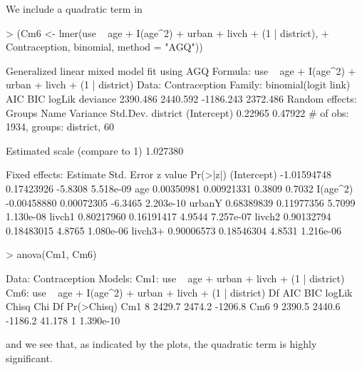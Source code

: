 \documentclass[12pt]{article}
\begin{document}
We include a quadratic term in 
\begin{Schunk}
\begin{Sinput}
> (Cm6 <- lmer(use ~ age + I(age^2) + urban + livch + (1 | district), 
+     Contraception, binomial, method = "AGQ"))
\end{Sinput}
\begin{Soutput}
Generalized linear mixed model fit using AGQ 
Formula: use ~ age + I(age^2) + urban + livch + (1 | district) 
   Data: Contraception 
 Family: binomial(logit link)
      AIC      BIC    logLik deviance
 2390.486 2440.592 -1186.243 2372.486
Random effects:
     Groups        Name    Variance    Std.Dev. 
   district (Intercept)     0.22965     0.47922 
# of obs: 1934, groups: district, 60

Estimated scale (compare to 1)  1.027380 

Fixed effects:
               Estimate  Std. Error z value  Pr(>|z|)
(Intercept) -1.01594748  0.17423926 -5.8308 5.518e-09
age          0.00350981  0.00921331  0.3809    0.7032
I(age^2)    -0.00458880  0.00072305 -6.3465 2.203e-10
urbanY       0.68389839  0.11977356  5.7099 1.130e-08
livch1       0.80217960  0.16191417  4.9544 7.257e-07
livch2       0.90132794  0.18483015  4.8765 1.080e-06
livch3+      0.90006573  0.18546304  4.8531 1.216e-06
\end{Soutput}
\begin{Sinput}
> anova(Cm1, Cm6)
\end{Sinput}
\begin{Soutput}
Data: Contraception
Models:
Cm1: use ~ age + urban + livch + (1 | district)
Cm6: use ~ age + I(age^2) + urban + livch + (1 | district)
    Df     AIC     BIC  logLik  Chisq Chi Df Pr(>Chisq)
Cm1  8  2429.7  2474.2 -1206.8                         
Cm6  9  2390.5  2440.6 -1186.2 41.178      1  1.390e-10
\end{Soutput}
\end{Schunk}
and we see that, as indicated by the plots, the quadratic term is highly significant.
\end{document}
